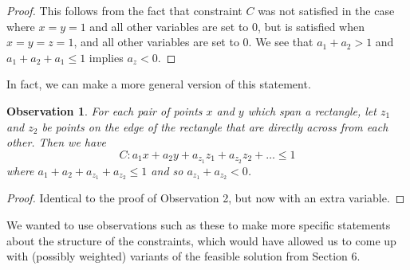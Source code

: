 \documentclass[11pt]{article}
\newtheorem{observation}{Observation}
\begin{document}
\begin{proof}
This follows from the fact that constraint $C$ was not satisfied in the case where $x = y = 1$ and all other variables are set to 0, but is satisfied when $x = y = z = 1$, and all other variables are set to 0. We see that $a_1 + a_2 > 1$ and $a_1 + a_2 + a_1 \leq 1$ implies $a_z < 0$. \end{proof}

In fact, we can make a more general version of this statement.

\begin{observation}
For each pair of points $x$ and $y$ which span a rectangle, let $z_1$ and $z_2$ be points on the edge of the rectangle that are directly across from each other. Then we have 
\[ C : a_1x + a_2y + a_{z_1}z_1 + a_{z_2}z_2 + \dots \leq 1\]
where $a_1 + a_2 + a_{z_1} + a_{z_2} \leq 1$ and so $a_{z_1} + a_{z_2} < 0$. 
\end{observation}

\begin{proof}
Identical to the proof of Observation 2, but now with an extra variable. \end{proof}

We wanted to use observations such as these to make more specific statements about the structure of the constraints, which would have allowed us to come up with (possibly weighted) variants of the feasible solution from Section 6.
\end{document}
